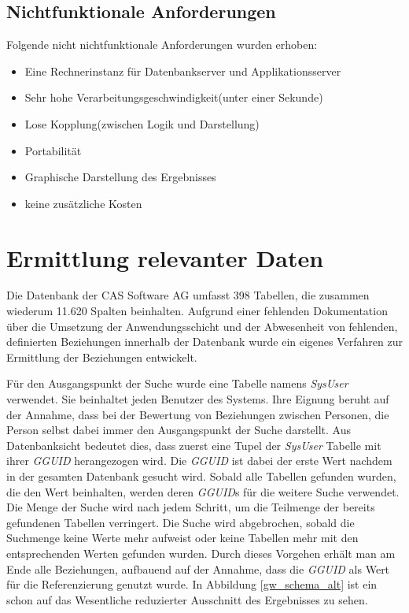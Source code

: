 \subsection{Nichtfunktionale Anforderungen}

Folgende nicht nichtfunktionale Anforderungen wurden erhoben:

\begin{itemize}
	
	\item Eine Rechnerinstanz für Datenbankserver und Applikationsserver 
	
	\item Sehr hohe Verarbeitungsgeschwindigkeit(unter einer Sekunde)
	
	\item Lose Kopplung(zwischen Logik und Darstellung)
	
	\item Portabilität
	
	\item Graphische Darstellung des Ergebnisses
	
	\item keine zusätzliche Kosten

\end{itemize}

\section{Ermittlung relevanter Daten}
\label{ch:Systemanalyse:sec:Information}

Die Datenbank der CAS Software AG umfasst 398 Tabellen, die zusammen wiederum 11.620 Spalten beinhalten. Aufgrund einer fehlenden Dokumentation über die Umsetzung der Anwendungsschicht und der Abwesenheit von fehlenden, definierten Beziehungen innerhalb der Datenbank wurde ein eigenes Verfahren zur Ermittlung der Beziehungen entwickelt. 

Für den Ausgangspunkt der Suche wurde eine Tabelle namens \textit{SysUser} verwendet. Sie beinhaltet jeden Benutzer des Systems. Ihre Eignung beruht auf der Annahme, dass bei der Bewertung von Beziehungen zwischen Personen, die Person selbst dabei immer den Ausgangspunkt der Suche darstellt. Aus Datenbanksicht bedeutet dies, dass zuerst eine Tupel der \textit{SysUser} Tabelle mit ihrer \textit{GGUID} herangezogen wird. Die \textit{GGUID} ist dabei der erste Wert nachdem in der gesamten Datenbank gesucht wird. Sobald alle Tabellen gefunden wurden, die den Wert beinhalten, werden deren \textit{GGUID}s für die weitere Suche verwendet. Die Menge der Suche wird nach jedem Schritt, um die Teilmenge der bereits gefundenen Tabellen verringert. Die Suche wird abgebrochen, sobald die Suchmenge keine Werte mehr aufweist oder keine Tabellen mehr mit den entsprechenden Werten gefunden wurden. Durch dieses Vorgehen erhält man am Ende alle Beziehungen, aufbauend auf der Annahme, dass die \textit{GGUID} als Wert für die Referenzierung genutzt wurde. In Abbildung \ref{gw_schema_alt} ist ein schon auf das Wesentliche reduzierter Ausschnitt des Ergebnisses zu sehen. 

